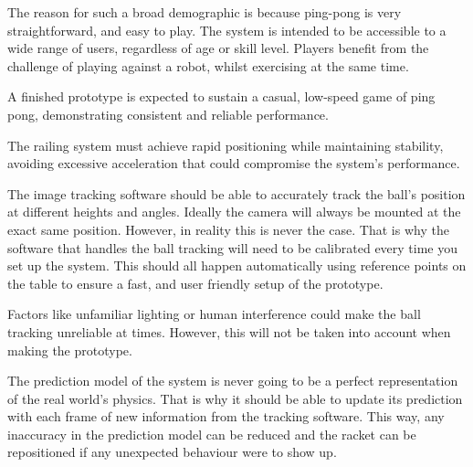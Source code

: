 The reason for such a broad demographic is because ping-pong is very straightforward, and easy to play. The system is intended to be accessible to a wide range of users, regardless of age or skill level. Players benefit from the challenge of playing against a robot, whilst exercising at the same time.

A finished prototype is expected to sustain a casual, low-speed game of ping pong, demonstrating consistent and reliable performance.

The railing system must achieve rapid positioning while maintaining stability, avoiding excessive acceleration that could compromise the system's performance.

The image tracking software should be able to accurately track the ball's position at different heights and angles. Ideally the camera will always be mounted at the exact same position. However, in reality this is never the case. That is why the software that handles the ball tracking will need to be calibrated every time you set up the system. This should all happen automatically using reference points on the table to ensure a fast, and user friendly setup of the prototype.

Factors like unfamiliar lighting or human interference could make the ball tracking unreliable at times. However, this will not be taken into account when making the prototype.

The prediction model of the system is never going to be a perfect representation of the real world's physics. That is why it should be able to update its prediction with each frame of new information from the tracking software. This way, any inaccuracy in the prediction model can be reduced and the racket can be repositioned if any unexpected behaviour were to show up.
